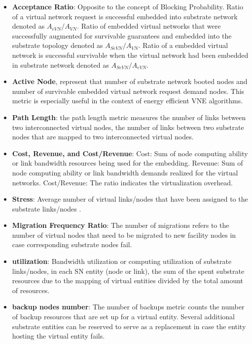 \begin{itemize}
  \item \textbf{Acceptance Ratio}: Opposite to the concept of Blocking Probability. Ratio of a virtual network request is successful embedded into substrate network denoted as $A_{eVN}/A_{VN}$. Ratio of embedded virtual networks that were successfully augmented for survivable guarantees and embedded into the substrate topology denoted as $A_{SeVN}/A_{VN}$. Ratio of a embedded virtual network is successful survivable when the virtual network had been embedded in substrate network denoted as $A_{SeVN}/A_{eVN}$.
  \item \textbf{Active Node}, represent that number of substrate network booted nodes and number of survivable embedded virtual network request demand nodes. This metric is especially useful in the context of energy efficient VNE algorithms.
  \item \textbf{Path Length}: the path length metric measures the number of links between two interconnected virtual nodes, the number of links between two substrate nodes that are mapped to two interconnected virtual nodes.

  \item \textbf{Cost, Revenue, and Cost/Revenue}: Cost: Sum of node computing ability or link bandwidth resources being used for the embedding. Revenue: Sum of node computing ability or link bandwidth demands realized for the virtual networks. Cost/Revenue: The ratio indicates the virtualization overhead.
  \item \textbf{Stress}: Average number of virtual links/nodes that have been assigned to the substrate links/nodes .
 \item \textbf{Migration Frequency Ratio}: The number of migrations refers to the number of virtual nodes that need to be migrated to new facility nodes in case corresponding substrate nodes fail.
 \item \textbf{utilization}: Bandwidth utilization or computing utilization of substrate links/nodes, in each SN entity (node or link), the sum of the spent substrate resources due to the mapping of virtual entities divided by the total amount of resources.
 \item \textbf{backup nodes number}: The number of backups metric counts the number of backup resources that are set up for a virtual entity. Several additional substrate entities can be reserved to serve as a replacement in case the entity hosting the virtual entity fails.
\end{itemize}
